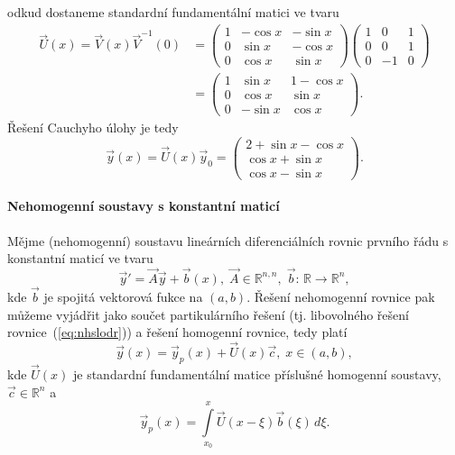 \begin{sol}
\[   \]
   odkud dostaneme standardní fundamentální matici ve tvaru
   \[
      \begin{split}
      \vec{U}(x) = \vec{V}(x)\vec{V}^{-1}(0) &=
      \begin{pmatrix}
         1 & -\cos x & -\sin x\\
         0 & \sin x  & -\cos x\\
         0 & \cos x  & \sin x
      \end{pmatrix}
      \begin{pmatrix}
         1 & 0 & 1\\
         0 & 0  &1\\
         0 & -1  & 0
      \end{pmatrix}\\
      &=
      \begin{pmatrix}
         1 & \sin x  & 1-\cos x\\
         0 & \cos x  & \sin x\\
         0 & -\sin x & \cos x
      \end{pmatrix}.
      \end{split}
   \]
   Řešení Cauchyho úlohy je tedy
   \[
      \vec{y}(x) = \vec{U}(x)\vec{y}_0
      =
      \begin{pmatrix}
         2 + \sin x  -\cos x\\
         \cos x  + \sin x\\
         \cos x - \sin x
      \end{pmatrix}.
   \]
\end{sol}

\paragraph{Nehomogenní soustavy s konstantní maticí}
Mějme (nehomogenní) soustavu lineárních diferenciálních rovnic prvního řádu s konstantní maticí ve tvaru
\begin{equation}\label{eq:nhslodr}
   \vec{y}' = \vec{A}\vec{y} + \vec{b}(x), \; \vec{A}\in\mathbb{R}^{n,n}, \; \vec{b}:\,\mathbb{R}\rightarrow\mathbb{R}^n,
\end{equation}
kde $\vec{b}$ je spojitá vektorová fukce na $(a,b)$.
Řešení nehomogenní rovnice pak můžeme vyjádřit jako součet partikulárního řešení 
(tj. libovolného řešení rovnice~(\ref{eq:nhslodr})) a řešení homogenní rovnice, tedy platí
\[
   \vec{y}(x) = \vec{y}_p(x) + \vec{U}(x)\vec{c}, \; x\in(a,b),
\]
kde $\vec{U}(x)$ je standardní fundamentální matice příslušné homogenní soustavy, $\vec{c}\in\mathbb{R}^n$ a
\[
   \vec{y}_p(x) = \int\limits_{x_0}^x\vec{U}(x-\xi)\vec{b}(\xi)\,d\xi.
\]

